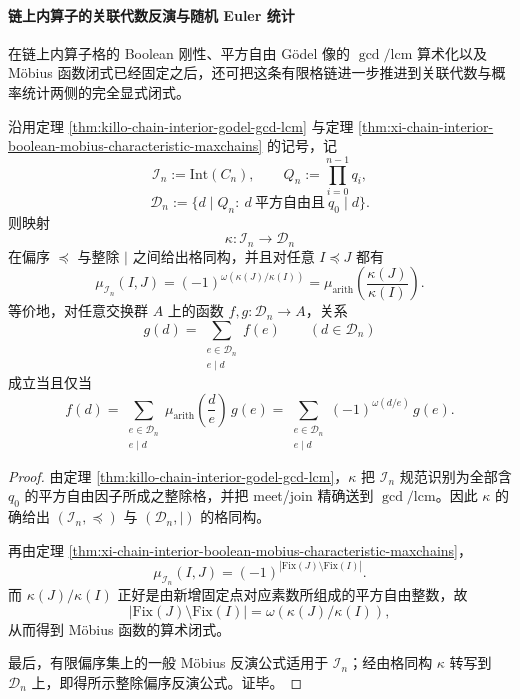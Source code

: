 \paragraph{链上内算子的关联代数反演与随机 Euler 统计}
在链上内算子格的 Boolean 刚性、平方自由 Gödel 像的 \(\gcd/\mathrm{lcm}\) 算术化以及 Möbius 函数闭式已经固定之后，还可把这条有限格链进一步推进到关联代数与概率统计两侧的完全显式闭式。

\begin{theorem}\label{thm:xi-chain-interior-incidence-algebra-mobius-inversion}
沿用定理 \ref{thm:killo-chain-interior-godel-gcd-lcm} 与定理 \ref{thm:xi-chain-interior-boolean-mobius-characteristic-maxchains} 的记号，记
\[
\mathcal I_n:=\mathrm{Int}(C_n),
\qquad
Q_n:=\prod_{i=0}^{n-1}q_i,
\]
\[
\mathcal D_n
:=
\{d\mid Q_n:\ d\ \text{平方自由且}\ q_0\mid d\}.
\]
则映射
\[
\kappa:\mathcal I_n\longrightarrow \mathcal D_n
\]
在偏序 \(\preceq\) 与整除 \(\mid\) 之间给出格同构，并且对任意 \(I\preceq J\) 都有
\[
\mu_{\mathcal I_n}(I,J)
=
(-1)^{\omega(\kappa(J)/\kappa(I))}
=
\mu_{\mathrm{arith}}\!\left(\frac{\kappa(J)}{\kappa(I)}\right).
\]
等价地，对任意交换群 \(A\) 上的函数 \(f,g:\mathcal D_n\to A\)，关系
\[
g(d)=\sum_{\substack{e\in \mathcal D_n\\ e\mid d}}f(e)
\qquad
(d\in \mathcal D_n)
\]
成立当且仅当
\[
f(d)
=
\sum_{\substack{e\in \mathcal D_n\\ e\mid d}}
\mu_{\mathrm{arith}}\!\left(\frac{d}{e}\right)\,g(e)
=
\sum_{\substack{e\in \mathcal D_n\\ e\mid d}}
(-1)^{\omega(d/e)}\,g(e).
\]
\end{theorem}
\begin{proof}
由定理 \ref{thm:killo-chain-interior-godel-gcd-lcm}，\(\kappa\) 把 \(\mathcal I_n\) 规范识别为全部含 \(q_0\) 的平方自由因子所成之整除格，并把 meet/join 精确送到 \(\gcd/\mathrm{lcm}\)。因此 \(\kappa\) 的确给出 \((\mathcal I_n,\preceq)\) 与 \((\mathcal D_n,\mid)\) 的格同构。

再由定理 \ref{thm:xi-chain-interior-boolean-mobius-characteristic-maxchains}，
\[
\mu_{\mathcal I_n}(I,J)
=
(-1)^{|\mathrm{Fix}(J)\setminus \mathrm{Fix}(I)|}.
\]
而 \(\kappa(J)/\kappa(I)\) 正好是由新增固定点对应素数所组成的平方自由整数，故
\[
|\mathrm{Fix}(J)\setminus \mathrm{Fix}(I)|
=
\omega(\kappa(J)/\kappa(I)),
\]
从而得到 Möbius 函数的算术闭式。

最后，有限偏序集上的一般 Möbius 反演公式适用于 \(\mathcal I_n\)；经由格同构 \(\kappa\) 转写到 \(\mathcal D_n\) 上，即得所示整除偏序反演公式。证毕。
\end{proof}

